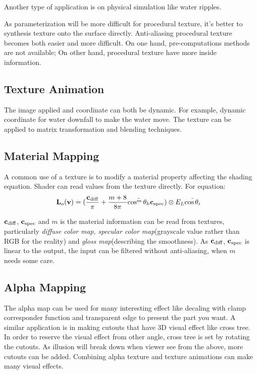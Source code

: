 \documentclass[10pt, a4paper]{article}
\begin{document}
Another type of application is on physical simulation like water ripples. 

As parameterization will be more difficult for procedural texture, it's better to synthesis texture onto the surface directly. Anti-aliasing procedural texture becomes both easier and more difficult. On one hand, pre-computations methods are not available; On other hand, procedural texture have more inside information. 

\subsection{Texture Animation}  
The image applied and coordinate can both be dynamic. For example, dynamic coordinate for water downfall to make the water move. The texture can be applied to matrix transformation and blending techniques. 

\subsection{Material Mapping}
A common use of a texture is to modify a material property affecting the shading equation. Shader can read values from the texture directly. For equation:
$$\textbf{L}_o(\textbf{v}) = (\frac{\textbf{c}_{\rm{diff}}}{\pi} + \frac{m + 8}{8\pi}\bar{\cos^m{\theta_h}}\textbf{c}_{\rm{spec}}) \otimes E_L\bar{\cos{\theta_i}}$$

$\textbf{c}_{\rm{diff}}$, $\textbf{c}_{\rm{spec}}$ and $m$ is the material information can be read from textures, particularly \emph{diffuse color map, specular color map}(grayscale value rather than RGB for the reality) and \emph{gloss map}(describing the smoothness). As $\textbf{c}_{\rm{diff}}$, $\textbf{c}_{\rm{spec}}$ is linear to the output, the input can be filtered without anti-aliasing, when $m$ needs some care. 
\subsection{Alpha Mapping}
The alpha map can be used for many interesting effect like decaling with clamp corresponder function and transparent edge to present the part you want. A similar application is in making cutouts that have 3D visual effect like cross tree. In order to reserve the visual effect from other angle, cross tree is set by rotating the cutouts. As illusion will break down when viewer see from the above, more cutouts can be added. Combining alpha texture and texture animations can make many visual effects. 
\end{document}
